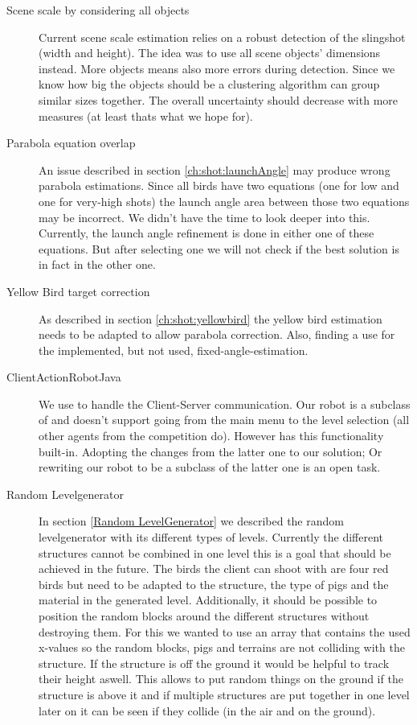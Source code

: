\begin{description}
	\item[Scene scale by considering all objects]
	Current scene scale estimation relies on a robust detection of the slingshot (width and height). The idea was to use all scene objects' dimensions instead. More objects means also more errors during detection. Since we know how big the objects should be a clustering algorithm can group similar sizes together. The overall uncertainty should decrease with more measures (at least thats what we hope for).
	
	\item[Parabola equation overlap]
	An issue described in section \ref{ch:shot:launchAngle} may produce wrong parabola estimations. Since all birds have two equations (one for low and one for very-high shots) the launch angle area between those two equations may be incorrect. We didn't have the time to look deeper into this. Currently, the launch angle refinement is done in either one of these equations. But after selecting one we will not check if the best solution is in fact in the other one.
	
	\item[Yellow Bird target correction]
	As described in section \ref{ch:shot:yellowbird} the yellow bird estimation needs to be adapted to allow parabola correction. Also, finding a use for the implemented, but not used, fixed-angle-estimation.
	
	\item[ClientActionRobotJava]
	We use  to handle the Client-Server communication. Our robot is a subclass of  and doesn't support going from the main menu to the level selection (all other agents from the competition do). However  has this functionality built-in. Adopting the changes from the latter one to our solution; Or rewriting our robot to be a subclass of the latter one is an open task.
	
	\item[Random Levelgenerator]
	In section \ref{Random LevelGenerator} we described the random levelgenerator with its different types of levels.
	Currently the different structures cannot be combined in one level this is a goal that should be achieved in the future. The birds the client can shoot with are four red birds but need to be adapted to the structure, the type of pigs and the material in the generated level. Additionally, it should be possible to position the random blocks around the different structures without destroying them. For this we wanted to use an array that contains the used x-values so the random blocks, pigs and terrains are not colliding with the structure. If the structure is off the ground it would be helpful to track their height aswell. This allows to put random things on the ground if the structure is above it and if multiple structures are put together in one level later on it can be seen if they collide (in the air and on the ground).
\end{description}

